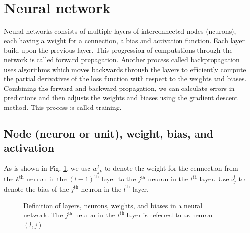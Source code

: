 \documentclass{article}
\newcommand{\tmop}[1]{\ensuremath{\operatorname{#1}}}
\begin{document}
\section{Neural network}

Neural networks consists of multiple layers of interconnected nodes (neurons),
each having a weight for a connection, a bias and activation function. Each
layer build upon the previous layer. This progression of computations through
the network is called forward propagation. Another process called
backpropagation uses algorithms which moves backwards through the layers to
efficiently compute the partial derivatives of the loss function with respect
to the weights and biases. Combining the forward and backward propagation, we
can calculate errors in predictions and then adjusts the weights and biases
using the gradient descent method. This process is called training.

\subsection{ Node (neuron or unit), weight, bias, and activation}

As is shown in Fig. \ref{22-3-13-a1}, we use $w_{j k}^l$ to denote the weight
for the connection from the $k^{\tmop{th}}$ neuron in the $(l -
1)^{\tmop{th}}$ layer to the $j^{\tmop{th}}$ neuron in the $l^{\tmop{th}}$
layer. Use $b_j^l$ to denote the bias of the $j^{\tmop{th}}$ neuron in the
$l^{\tmop{th}}$ layer.

\begin{figure}[h]
  \caption{\label{22-3-13-a1}Definition of layers, neurons, weights, and
  biases in a neural network. The $j^{\tmop{th}}$ neuron in the
  $l^{\tmop{th}}$ layer is referred to as neuron $(l, j)$}
\end{figure}
\end{document}
